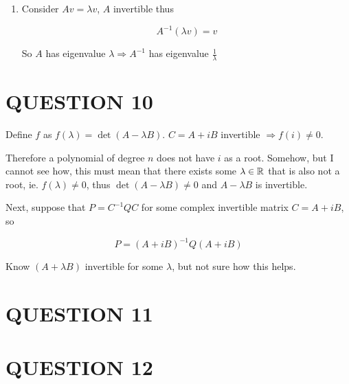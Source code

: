 \documentclass[a4paper]{article}
\begin{document}
\begin{enumerate} [label = (\alph*)]
	\item Consider $ A v = \lambda v  $, $ A $ invertible thus
	
	\[ A^{-1}(\lambda v) = v \]
	
	So $ A $ has eigenvalue $ \lambda  \Rightarrow A^{-1} $ has eigenvalue $ \frac{1}{\lambda} $
	
\end{enumerate}

\section{QUESTION 10}

Define $ f $ as $ f(\lambda) = \det(A - \lambda B) $. $ C = A + iB $ invertible $ \Rightarrow f(i) \neq 0 $.

Therefore a polynomial of degree $ n $ does not have $ i $ as a root. Somehow, but I cannot see how, this must mean that there exists some $ \lambda \in \mathbb{R} $ that is also not a root, ie. $ f(\lambda) \neq 0 $, thus $ \det(A - \lambda B) \neq 0 $ and $ A - \lambda B $ is invertible.

Next, suppose that $ P = C^{-1} Q C $ for some complex invertible matrix $ C = A + i B $, so

\[ P = (A + i B)^{-1} Q (A + iB) \] 

Know $ (A+ \lambda B) $ invertible for some $ \lambda $, but not sure how this helps. 

\section{QUESTION 11}


\section{QUESTION 12}
\end{document}
